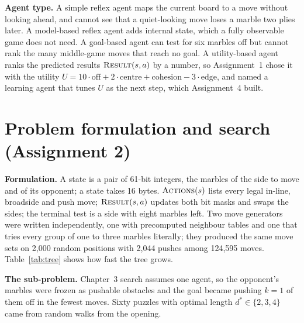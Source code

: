 \documentclass[a4paper,10pt]{article}
\begin{document}
\textbf{Agent type.} A simple reflex agent maps the current board to a move without looking ahead, and cannot see
that a quiet-looking move loses a marble two plies later. A model-based reflex agent adds internal state, which a
fully observable game does not need. A goal-based agent can test for six marbles off but cannot rank the many
middle-game moves that reach no goal. A utility-based agent ranks the predicted results $\textsc{Result}(s,a)$ by a
number, so Assignment~1 chose it with the utility
$U = 10\cdot\text{off} + 2\cdot\text{centre} + \text{cohesion} - 3\cdot\text{edge}$, and named a learning agent that
tunes $U$ as the next step, which Assignment~4 built.

\section{Problem formulation and search (Assignment 2)}

\textbf{Formulation.} A state is a pair of 61-bit integers, the marbles of the side to move and of its opponent; a
state takes 16 bytes. $\textsc{Actions}(s)$ lists every legal in-line, broadside and push move;
$\textsc{Result}(s,a)$ updates both bit masks and swaps the sides; the terminal test is a side with eight marbles
left. Two move generators were written independently, one with precomputed neighbour tables and one that tries
every group of one to three marbles literally; they produced the same move sets on 2,000 random positions with
2,044 pushes among 124,595 moves. Table~\ref{tab:tree} shows how fast the tree grows.



\textbf{The sub-problem.} Chapter~3 search assumes one agent, so the opponent's marbles were frozen as pushable
obstacles and the goal became pushing $k=1$ of them off in the fewest moves. Sixty puzzles with optimal length
$d^*\in\{2,3,4\}$ came from random walks from the opening.
\end{document}
